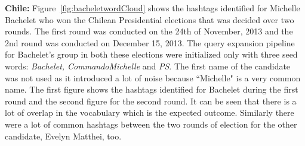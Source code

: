 \noindent
{\bf Chile:}
Figure~\ref{fig:bacheletwordCloud} shows the hashtags identified for Michelle Bachelet who won the Chilean Presidential elections that was decided over two rounds.
The first round was conducted on the 24th of November, 2013 and the 2nd round was conducted on December 15, 2013. 
The query expansion pipeline for Bachelet's group in both these elections were initialized only with three seed words: {\it Bachelet, CommandoMichelle} and {\it PS}. 
The first name of the candidate was not used as it introduced a lot of noise because ``Michelle" is a very common name.
The first figure shows the hashtags identified for Bachelet during the first round and the second figure for the second round. 
It can be seen that there is a lot of overlap in the vocabulary which is the expected outcome. 
Similarly there were a lot of common hashtags between the two rounds of election for the other candidate, Evelyn Matthei, too.
